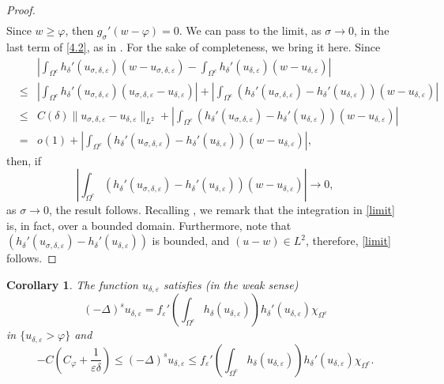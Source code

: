 \documentclass[11pt, reqno]{amsart}
\newtheorem{corollary}{Corollary}
\numberwithin{equation}{section}
\numberwithin{theorem}{section}
\numberwithin{lemma}{section}
\numberwithin{corollary}{section}
\numberwithin{remark}{section}
\numberwithin{proposition}{section}
\numberwithin{definition}{section}
\newcommand{\e}{\varepsilon}
\begin{document}
\begin{proof}
\begin{equation}
\begin{split}
	\end{split}
	\end{equation}
	Since $w\geq\varphi$, then $g_\sigma'(w-\varphi)=0$. We can pass to the limit, as $\sigma\to0$, in the last term of \eqref{4.2}, as in \cite[Proof of Lemma 4.1]{TU17,Y16}. For the sake of completeness, we bring it here. Since
  \begin{eqnarray*}
    &&\left|\int_{\Omega^c}h_\delta'(u_{\sigma,\delta,\varepsilon})(w-u_{\sigma,\delta,\varepsilon})-\int_{\Omega^c}h_\delta'(u_{\delta,\varepsilon})(w-u_{\delta,\varepsilon})\right|\nonumber\\
    &\leq& \left|\int_{\Omega^c}h_\delta'(u_{\sigma,\delta,\varepsilon})(u_{\sigma,\delta,\varepsilon}-u_{\delta,\varepsilon})\right|
    +\left|\int_{\Omega^c}(h_\delta'(u_{\sigma,\delta,\varepsilon})-h_\delta'(u_{\delta,\varepsilon}))(w-u_{\delta,\varepsilon})\right|\nonumber \\
    &\leq& C(\delta)\|u_{\sigma,\delta,\varepsilon}-u_{\delta,\varepsilon}\|_{L^2}+\left|\int_{\Omega^c}(h_\delta'(u_{\sigma,\delta,\varepsilon})-h_\delta'(u_{\delta,\varepsilon}))(w-u_{\delta,\varepsilon})\right|\nonumber \\
    &=& o(1)+\left|\int_{\Omega^c}(h_\delta'(u_{\sigma,\delta,\varepsilon})-h_\delta'(u_{\delta,\varepsilon}))(w-u_{\delta,\varepsilon})\right|,
  \end{eqnarray*}
  then, if
  \begin{equation}\label{limit}
    \left|\int_{\Omega^c}(h_\delta'(u_{\sigma,\delta,\varepsilon})-h_\delta'(u_{\delta,\varepsilon}))(w-u_{\delta,\varepsilon})\right|\rightarrow0,
  \end{equation}
  as $\sigma\rightarrow0$, the result follows. Recalling , we remark that the integration in \eqref{limit} is, in fact, over a bounded domain. Furthermore, note that $(h_\delta'(u_{\sigma,\delta,\varepsilon})-h_\delta'(u_{\delta,\varepsilon}))$ is bounded, and $(u-w)\in L^2$, therefore, \eqref{limit} follows. 
\end{proof}
\begin{corollary}\label{c4.1}
	The function $u_{\delta,\varepsilon}$ satisfies (in the weak sense)
	\begin{equation}\label{4.3}	
    (-\Delta)^su_{\delta,\varepsilon}=f_\e'\left(\int_{\Omega^c}h_\delta(u_{\delta,\e}) \right)h_\delta'(u_{\delta,\e})\chi_{\Omega^c}
	\end{equation} 
	in $\{u_{\delta,\e}>\varphi\}$ and
	\begin{equation}\label{4.4}
	-C \left(C_\varphi
	+\frac{1}{\varepsilon\delta}\right)\le(-\Delta)^su_{\delta,\varepsilon} \le  f_\e'\left(\int_{\Omega^c}h_\delta(u_{\delta,\e})\right)h_\delta'(u_{\delta,\e})\chi_{\Omega^c}.  
	\end{equation}
\end{corollary}
\end{document}
